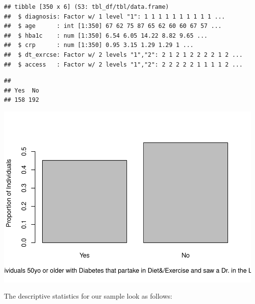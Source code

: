 \documentclass[
  man,floatsintext]{apa6}
\begin{document}
\begin{verbatim}
## tibble [350 x 6] (S3: tbl_df/tbl/data.frame)
##  $ diagnosis: Factor w/ 1 level "1": 1 1 1 1 1 1 1 1 1 1 ...
##  $ age      : int [1:350] 67 62 75 87 65 62 60 60 67 57 ...
##  $ hba1c    : num [1:350] 6.54 6.05 14.22 8.82 9.65 ...
##  $ crp      : num [1:350] 0.95 3.15 1.29 1.29 1 ...
##  $ dt_exrcse: Factor w/ 2 levels "1","2": 2 1 2 1 2 2 2 2 1 2 ...
##  $ access   : Factor w/ 2 levels "1","2": 2 2 2 2 2 1 1 1 1 2 ...
\end{verbatim}

\begin{verbatim}
## 
## Yes  No 
## 158 192
\end{verbatim}

\includegraphics{NEW_Final_Groupof5_files/figure-latex/RQ3-brittany-1.pdf}

The descriptive statistics for our sample look as follows:

\newpage
\end{document}
